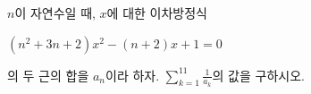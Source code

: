 $n$이 자연수일 때, $x$에 대한 이차방정식 \par\smallskip\noindent\hspace*{1.5em}$(n^2+3n+2)x^2-(n+2)x+1=0$\par\smallskip\noindent 의 두 근의 합을 $a_n$이라 하자. $\displaystyle\sum_{k=1}^{11}\frac{1}{a_k}$의 값을 구하시오.
